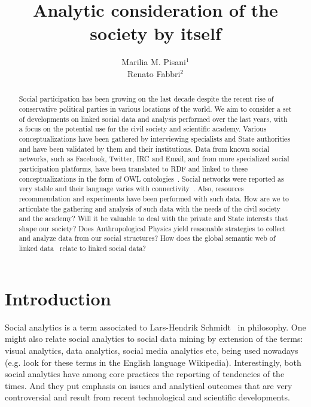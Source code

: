 \documentclass[letterpaper,10pt]{article}
\begin{document}
\title{Analytic consideration of the society by itself}

\author{Marilia M. Pisani$^1$\\
Renato Fabbri$^2$}
\address{$^1$CCNH/UFABC, $^2$IFSC/USP}

\begin{abstract}
Social participation has been growing on the last decade despite
the recent rise of conservative political parties 
in various locations of the world.
We aim to consider a set of developments on linked social data
and analysis performed over the last years, with a focus
on the potential use for the civil society and scientific academy.
Various conceptualizations have been gathered by interviewing specialists
and State authorities and have been validated by them and their institutions.
Data from known social networks, such as Facebook, Twitter, IRC and Email,
and from more specialized social participation platforms, have been
	translated to RDF and linked to these conceptualizations in the form of OWL ontologies~\cite{losd,pnud5}.
Social networks were reported as very stable and their language varies
	with connectivity~\cite{tese,stab}.
	Also, resources recommendation and experiments have been performed with such data.
	How are we to articulate the gathering and analysis 
	of such data with the needs of the civil society and the academy?
	Will it be valuable to deal with the private and State interests
	that shape our society?
	Does Anthropological Physics yield reasonable strategies
	to collect and analyze data from our social structures?
	How does the global semantic web of linked data~\cite{losd}
	relate to linked social data?
\end{abstract}

\section{Introduction}
Social analytics is a term associated to Lars-Hendrik Schmidt~\cite{wSA}
in philosophy.
One might also relate social analytics to social data mining
by extension of the terms: visual analytics, data analytics, social media analytics etc,
being used nowadays (e.g. look for these terms in the English language Wikipedia).
Interestingly, both social analytics 
have among core practices the reporting of tendencies of the times.
And they put emphasis on issues and analytical outcomes
that are very controversial and result from recent technological and scientific developments.
\end{document}
